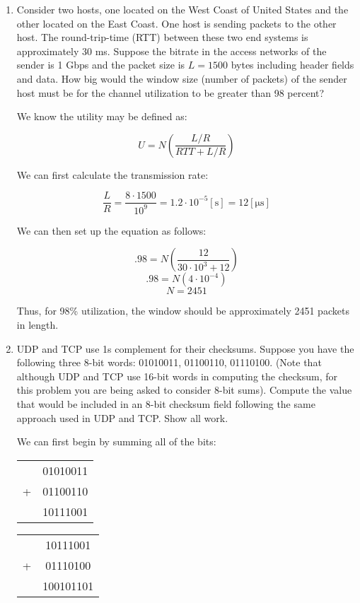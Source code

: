 \begin{enumerate}
  \item Consider two hosts, one located on the West Coast of United States and the other located on the East Coast. One host is sending packets to the other host. The round-trip-time (RTT) between these two end systems is approximately 30 ms. Suppose the bitrate in the access networks of the sender is 1 Gbps and the packet size is $L=1500$ bytes including header fields and data. How big would the window size (number of packets) of the sender host must be for the channel utilization to be greater than 98 percent? 

    We know the utility may be defined as:

    $$U=N\left(\frac{L/R}{RTT+L/R}\right)$$

    We can first calculate the transmission rate:

    $$\frac{L}{R}=\frac{8\cdot1500}{10^9}=1.2\cdot10^{-5}[\si{\second}]=12[\si{\micro\second}]$$

    We can then set up the equation as follows:

    $$.98=N\left( \frac{12}{30\cdot10^3+12} \right)$$
    $$.98=N\left( 4\cdot10^{-4} \right)$$
    $$N=2451$$

    Thus, for 98\% utilization, the window should be approximately 2451 packets in length.

  \item UDP and TCP use 1s complement for their checksums. Suppose you have the following three 8-bit words: 01010011, 01100110, 01110100. (Note that although UDP and TCP use 16-bit words in computing the checksum, for this problem you are being asked to consider 8-bit sums).  Compute the value that would be included in an 8-bit checksum field following the same approach used in UDP and TCP. Show all work.

    We can first begin by summing all of the bits:

  \begin{center}
    \begin{tabular}[h]{c c}
      & 01010011\\
      + & 01100110\\
      \hline
      & 10111001
    \end{tabular}
  \end{center}

  \begin{center}
    \begin{tabular}[h]{c c}
      & 10111001\\
      + & 01110100\\
      \hline
      & 100101101
    \end{tabular}
  \end{center}


\end{enumerate}
